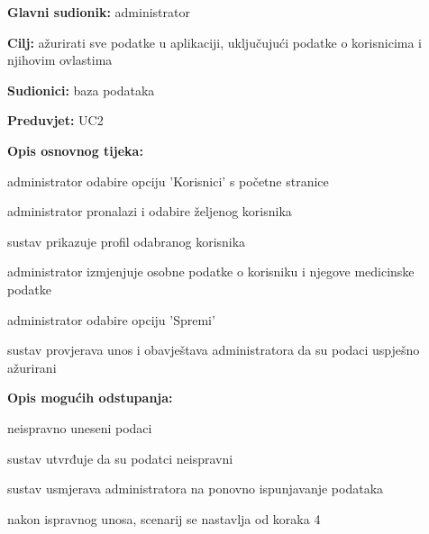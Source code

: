         
                    \noindent {}
					\begin{packed_item}
	
						\item \textbf{Glavni sudionik: }administrator
						\item  \textbf{Cilj:} ažurirati sve podatke u aplikaciji, uključujući podatke o korisnicima i njihovim ovlastima
						\item  \textbf{Sudionici:} baza podataka
						\item  \textbf{Preduvjet:} UC2
						\item  \textbf{Opis osnovnog tijeka:}
						
						\item[] \begin{packed_enum}
							\item administrator odabire opciju 'Korisnici' s početne stranice
							\item administrator pronalazi i odabire željenog korisnika
							\item sustav prikazuje profil odabranog korisnika
							\item administrator izmjenjuje osobne podatke o korisniku i njegove medicinske podatke
							\item administrator odabire opciju 'Spremi'
							\item sustav provjerava unos i obavještava administratora da su podaci uspješno ažurirani
						
						\end{packed_enum}
						\item  \textbf{Opis mogućih odstupanja:}
						
						\item[] \begin{packed_item}
                            \item[6.a] neispravno uneseni podaci
                            \item[] \begin{packed_enum}
                            	\item sustav utvrđuje da su podatci neispravni
								\item sustav usmjerava administratora na ponovno ispunjavanje podataka
								\item nakon ispravnog unosa, scenarij se nastavlja od koraka 4
							\end{packed_enum}
						\end{packed_item}
					\end{packed_item}

